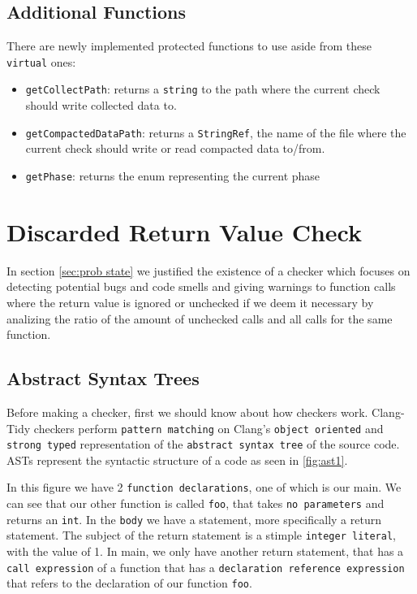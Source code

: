 \subsection{Additional Functions}

There are newly implemented protected functions to use aside from these \lstinline{virtual} ones:
\begin{itemize}
	\item \texttt{getCollectPath}: returns a \lstinline{string} to the path where the current check should write collected data to.
	\item \texttt{getCompactedDataPath}: returns a \lstinline{StringRef}, the name of the file where the current check should write or read compacted data to/from.
	\item \texttt{getPhase}: returns the enum representing the current phase
\end{itemize}

\section{Discarded Return Value Check} %
\label{sec:dev checker}

In section \cref{sec:prob state} we justified the existence of a checker which focuses on detecting potential bugs and code smells
and giving warnings to function calls where the return value is ignored or unchecked if we deem it necessary by analizing the ratio
of the amount of unchecked calls and all calls for the same function.

\subsection{Abstract Syntax Trees}

Before making a checker, first we should know about how checkers work. Clang-Tidy checkers perform \texttt{pattern matching} on
Clang's \texttt{object oriented} and \texttt{strong typed} representation of the \texttt{abstract syntax tree} of the source code.
ASTs represent the syntactic structure of a code as seen in \cref{fig:ast1}.

In this figure we have 2 \texttt{function declarations}, one of which is our main. We can see that our other function is called \texttt{foo},
that takes \texttt{no parameters} and returns an \lstinline{int}. In the \texttt{body} we have a statement, more specifically a
return statement. The subject of the return statement is a stimple \texttt{integer literal}, with the value of 1.
In main, we only have another return statement, that has a \texttt{call expression} of a function that has a
\texttt{declaration reference expression} that refers to the declaration of our function \texttt{foo}.

